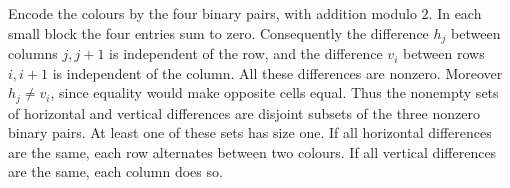 Encode the colours by the four binary pairs, with addition modulo $2$. In each small block the four entries sum to zero. Consequently the difference $h_j$ between columns $j,j+1$ is independent of the row, and the difference $v_i$ between rows $i,i+1$ is independent of the column. All these differences are nonzero. Moreover $h_j\ne v_i$, since equality would make opposite cells equal. Thus the nonempty sets of horizontal and vertical differences are disjoint subsets of the three nonzero binary pairs. At least one of these sets has size one. If all horizontal differences are the same, each row alternates between two colours. If all vertical differences are the same, each column does so.
